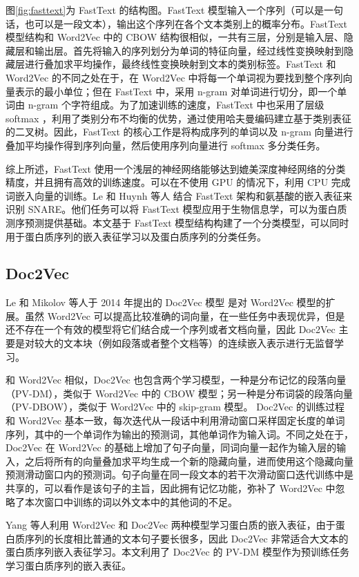 图\ref{fig:fasttext}为 FastText 的结构图。FastText 模型输入一个序列（可以是一句话，也可以是一段文本），输出这个序列在各个文本类别上的概率分布。FastText 模型结构和 Word2Vec 中的 CBOW 结构很相似，一共有三层，分别是输入层、隐藏层和输出层。首先将输入的序列划分为单词的特征向量，经过线性变换映射到隐藏层进行叠加求平均操作，最终线性变换映射到文本的类别标签。FastText 和 Word2Vec 的不同之处在于，在 Word2Vec 中将每一个单词视为要找到整个序列向量表示的最小单位；但在 FastText 中，采用 n-gram 对单词进行切分，即一个单词由 n-gram 个字符组成。为了加速训练的速度，FastText 中也采用了层级 softmax ，利用了类别分布不均衡的优势，通过使用哈夫曼编码建立基于类别表征的二叉树。因此，FastText 的核心工作是将构成序列的单词以及 n-gram 向量进行叠加平均操作得到序列向量，然后使用序列向量进行 softmax 多分类任务。

综上所述，FastText 使用一个浅层的神经网络能够达到媲美深度神经网络的分类精度，并且拥有高效的训练速度。可以在不使用 GPU 的情况下，利用 CPU 完成词嵌入向量的训练。Le 和 Huynh 等人\cite{le2019identifying} 结合 FastText 架构和氨基酸的嵌入表征来识别 SNARE。他们任务可以将 FastText 模型应用于生物信息学，可以为蛋白质测序预测提供基础。本文基于 FastText 模型结构构建了一个分类模型，可以同时用于蛋白质序列的嵌入表征学习以及蛋白质序列的分类任务。

\subsection{Doc2Vec}
Le 和 Mikolov 等人于 2014 年提出的 Doc2Vec 模型 \cite{le2014distributed} 是对 Word2Vec 模型的扩展。虽然 Word2Vec 可以提高比较准确的词向量，在一些任务中表现优异，但是还不存在一个有效的模型将它们结合成一个序列或者文档向量，因此 Doc2Vec 主要是对较大的文本块（例如段落或者整个文档等）的连续嵌入表示进行无监督学习。

和 Word2Vec 相似，Doc2Vec 也包含两个学习模型，一种是分布记忆的段落向量（PV-DM），类似于 Word2Vec 中的 CBOW 模型；另一种是分布词袋的段落向量（PV-DBOW），类似于 Word2Vec 中的 skip-gram 模型。
Doc2Vec 的训练过程和 Word2Vec 基本一致，每次迭代从一段话中利用滑动窗口采样固定长度的单词序列，其中的一个单词作为输出的预测词，其他单词作为输入词。不同之处在于，Doc2Vec 在 Word2Vec 的基础上增加了句子向量，同词向量一起作为输入层的输入，之后将所有的向量叠加求平均生成一个新的隐藏向量，进而使用这个隐藏向量预测滑动窗口内的预测词。句子向量在同一段文本的若干次滑动窗口迭代训练中是共享的，可以看作是该句子的主旨，因此拥有记忆功能，弥补了 Word2Vec 中忽略了本次窗口中训练的词以外文本中的其他词的不足。

Yang \cite{yang2018learned} 等人利用 Word2Vec 和 Doc2Vec 两种模型学习蛋白质的嵌入表征，由于蛋白质序列的长度相比普通的文本句子要长很多，因此 Doc2Vec 非常适合大文本的蛋白质序列嵌入表征学习。本文利用了 Doc2Vec 的 PV-DM 模型作为预训练任务学习蛋白质序列的嵌入表征。



